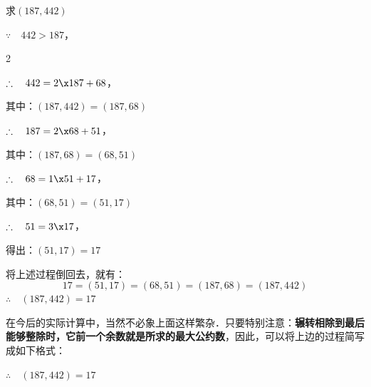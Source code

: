 \begin{example}
求$(187, 442)$    
\end{example}

\begin{solution}
$\because\quad 442>187$，

\begin{multicols}{2}
  \begin{center}
  \end{center}  

$\therefore\quad 442=2\x 187+68$，

其中：$(187,442)=(187,68)$

\begin{center}
\end{center}

$\therefore\quad 187=2\x 68+51$，

其中：$(187,68)=(68,51)$

\begin{center}
\end{center}

$\therefore\quad 68=1\x 51+17$，

其中：$(68,51)=(51,17)$

\begin{center}
\end{center}

$\therefore\quad 51=3\x 17$，

得出：$(51,17)=17$
\end{multicols}

将上述过程倒回去，就有：
\[17= (51, 17) = (68, 51) = (187, 68) = (187, 442)\] 
$\therefore\quad  (187, 442) =17$
\end{solution}


在今后的实际计算中，当然不必象上面这样繁杂．只要特别注意：\textbf{辗转相除到最后能够整除时，它前一个余数就是所求的最大公约数}，因此，可以将上边的过程简写成如下格式：
\begin{center}
\end{center}
$\therefore\quad (187,442)=17$



